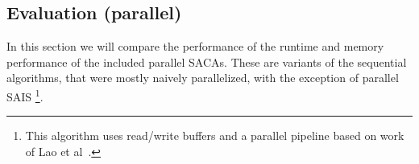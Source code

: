 
\subsection{Evaluation (parallel)}

In this section we will compare the performance of the runtime and memory performance of the included parallel SACAs.
These are variants of the sequential algorithms, that were mostly naively parallelized, with the exception of parallel SAIS
\footnote{This algorithm uses read/write buffers and a parallel pipeline based on work of Lao et al~\cite{psais}.}.

